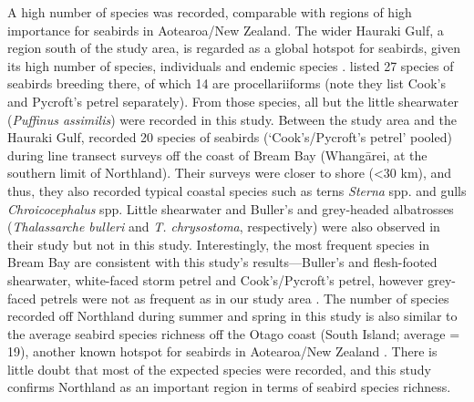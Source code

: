 \documentclass[preprint, 3p, authoryear]{elsarticle} %
\begin{document}
A high number of species was recorded, comparable with regions of high importance for seabirds in Aotearoa/New Zealand. The wider Hauraki Gulf, a region south of the study area, is regarded as a global hotspot for seabirds, given its high number of species, individuals and endemic species \citep{karpouzi2007, gaskin2017}. \citet{stateof2021} listed 27 species of seabirds breeding there, of which 14 are procellariiforms (note they list Cook's and Pycroft's petrel separately). From those species, all but the little shearwater (\emph{Puffinus assimilis}) were recorded in this study. Between the study area and the Hauraki Gulf, \citet{brough2025} recorded 20 species of seabirds (`Cook's/Pycroft's petrel' pooled) during line transect surveys off the coast of Bream Bay (Whang\={a}rei, at the southern limit of Northland). Their surveys were closer to shore (\textless30 km), and thus, they also recorded typical coastal species such as terns \emph{Sterna} spp. and gulls \emph{Chroicocephalus} spp. Little shearwater and Buller's and grey-headed albatrosses (\emph{Thalassarche bulleri} and \emph{T. chrysostoma}, respectively) were also observed in their study but not in this study. Interestingly, the most frequent species in Bream Bay are consistent with this study's results---Buller's and flesh-footed shearwater, white-faced storm petrel and Cook's/Pycroft's petrel, however grey-faced petrels were not as frequent as in our study area \citep{brough2025}. The number of species recorded off Northland during summer and spring in this study is also similar to the average seabird species richness off the Otago coast (South Island; average = 19), another known hotspot for seabirds in Aotearoa/New Zealand \citep{daudt2025}. There is little doubt that most of the expected species were recorded, and this study confirms Northland as an important region in terms of seabird species richness.
\end{document}
